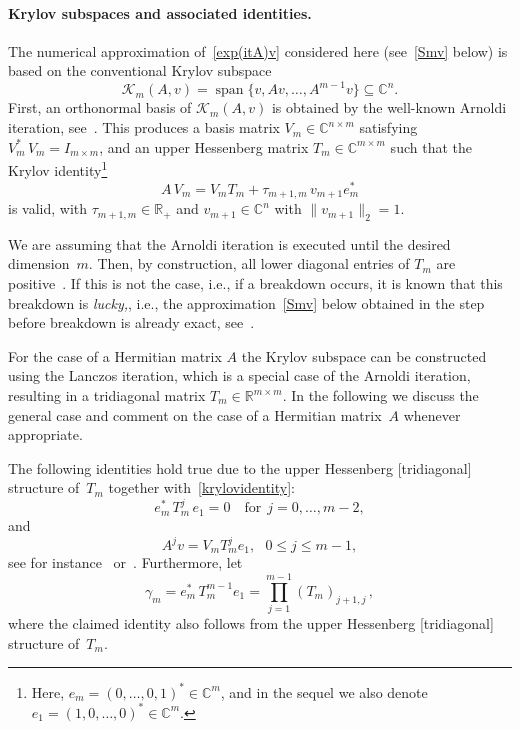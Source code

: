 \documentclass[smallextended]{svjour3pre}%
\numberwithin{equation}{section}
\numberwithin{figure}{section}
\numberwithin{table}{section}
\newcommand{\C}{\mathbb C}%
\newcommand{\R}{\mathbb R}
\DeclareMathOperator{\vecspan}{span}
\newcommand\tjnew[1]{{#1}}
\newcommand{\Kry}{\mathcal{K}}
\newcommand\Opgen{A}
\begin{document}
\paragraph{Krylov subspaces and associated identities.}
The numerical approximation of~\eqref{exp(itA)v} considered here
(see~\eqref{Smv} below)
is based on the conventional Krylov subspace
\begin{equation*}
\Kry_m(\Opgen,v) = \vecspan\{v,\Opgen v,\ldots,\Opgen^{m-1}v\} \subseteq \C^n.
\end{equation*}
First, \tjnew{an orthonormal} basis of $ \Kry_m(\Opgen,v) $ is obtained by the
well-known Arnoldi iteration, see~\cite{saad03}.
This produces a basis matrix $ V_m \in \C^{n \times m} $
satisfying $ V_m^\ast\,V_m = I_{m \times m} $,
and an upper Hessenberg matrix $ T_m \in \C^{m\times m} $
such that the Krylov identity\footnote{
          Here, $ {e_m = (0,\ldots,0,1)^\ast \in \C^m} $,
          and in the sequel we also denote
          $ {e_1 = (1,0,\ldots,0)^\ast \in \C^m} $.}
\begin{equation}\label{krylovidentity}
\Opgen\,V_m = V_m T_m + \tau_{m+1,m}\,v_{m+1}e_m^\ast
\end{equation}
is valid, with $\tau_{m+1,m}\in\R_+$
and $v_{m+1}\in\C^n$ with $\|v_{m+1}\|_2=1$.

\begin{remark}
We are assuming that the Arnoldi iteration is executed until the
desired dimension~$ m $. Then, by construction, all lower
diagonal entries of $ T_m $ are positive~\cite{saad03}.
If this is not the case, i.e., if a breakdown occurs, it is known
that this breakdown is {\em lucky,}, i.e., the approximation~\eqref{Smv}
below obtained in the step before breakdown is already exact,
see~\cite{saad92s}.
\end{remark}

For the case of a Hermitian matrix $A$
the Krylov subspace can be constructed using the Lanczos iteration,
which is a special case of the Arnoldi iteration,
resulting in a tridiagonal matrix $ T_m \in \R^{m \times m} $.
In the following we discuss the general case
and comment on the case of \tjnew{a Hermitian} matrix~$ A $
whenever appropriate.

The following identities hold true due to
the upper Hessenberg [tridiagonal] structure of~$ T_m $ together with~\eqref{krylovidentity}:
\begin{equation} \label{eTe}
e_m^\ast\,T_m^{j}\,e_1 = 0 \quad \text{for}~~ j=0,\ldots,m-2,
\end{equation}
and
\tjnew{
\begin{equation} \label{HVTm}
\Opgen^{j}v = V_m T_m^{j} e_1,~~~0\leq j \leq m-1,
\end{equation}
see for instance~\cite[Theorem 2]{DK89} or~\cite{saad92s}.}
Furthermore, let
\begin{equation} \label{gammam}
\gamma_m  = e_m^\ast\,T_m^{m-1} e_1
          = \prod_{j=1}^{m-1} (T_m)_{j+1,j}\,,
\end{equation}
where the claimed identity also follows from the
upper Hessenberg [tridiagonal] structure of~$ T_m $.
\end{document}
